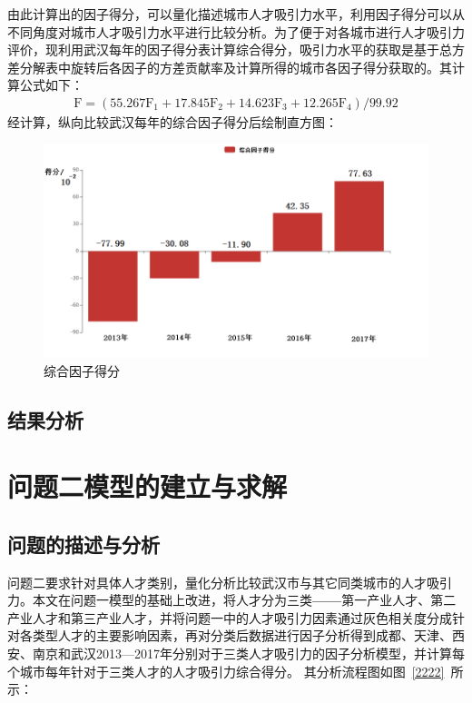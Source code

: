 \documentclass{whutmod}
\begin{document}
	由此计算出的因子得分，可以量化描述城市人才吸引力水平，利用因子得分可以从不同角度对城市人才吸引力水平进行比较分析。为了便于对各城市进行人才吸引力评价，现利用武汉每年的因子得分表计算综合得分，吸引力水平的获取是基于总方差分解表中旋转后各因子的方差贡献率及计算所得的城市各因子得分获取的。其计算公式如下：
	\begin{gather}
	\mathrm { F } = \left( 55.267 \mathrm { F } _ { 1 } + 17.845 \mathrm { F } _ { 2 } + 14.623 \mathrm { F } _ { 3 } + 12.265 \mathrm { F } _ { 4 } \right) / 99.92
	\end{gather}
	经计算，纵向比较武汉每年的综合因子得分后绘制直方图：
		\begin{figure}[H]
		\centering
		\includegraphics[width=\textwidth]{figures/wuhan.png}
		\caption{综合因子得分}
	\end{figure} 
	\subsection{结果分析}
	
	
	\section{问题二模型的建立与求解}
	\subsection{问题的描述与分析}
	问题二要求针对具体人才类别，量化分析比较武汉市与其它同类城市的人才吸引力。本文在问题一模型的基础上改进，将人才分为三类\textbf{——}第一产业人才、第二产业人才和第三产业人才，并将问题一中的人才吸引力因素通过灰色相关度分成针对各类型人才的主要影响因素，再对分类后数据进行因子分析得到成都、天津、西安、南京和武汉2013—2017年分别对于三类人才吸引力的因子分析模型，并计算每个城市每年针对于三类人才的人才吸引力综合得分。 其分析流程图如图~\ref{2222}~所示：
	
\end{document}
